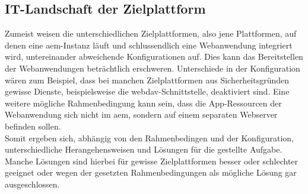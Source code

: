 \subsection{IT-Landschaft der Zielplattform}

Zumeist weisen die unterschiedlichen Zielplattformen, also jene Plattformen, auf denen eine \ac{aem}-Instanz läuft und schlussendlich eine Webanwendung integriert wird, untereinander abweichende Konfigurationen auf. Dies kann das Bereitstellen der Webanwendungen beträchtlich erschweren. Unterschiede in der Konfiguration wären zum Beispiel, dass bei manchen Zielplattformen aus Sicherheitsgründen gewisse Dienste, beispielsweise die \acs{webdav}-Schnittstelle, deaktiviert sind. Eine weitere mögliche Rahmenbedingung kann sein, dass die App-Ressourcen der Webanwendung sich nicht im \ac{aem}, sondern auf einem separaten Webserver befinden sollen. \\
Somit ergeben sich, abhängig von den Rahmenbedingen und der Konfiguration, unterschiedliche Herangehensweisen und Lösungen für die gestellte Aufgabe. Manche Lösungen sind hierbei für gewisse Zielplattformen besser oder schlechter geeignet oder wegen der gesetzten Rahmenbedingungen als mögliche Lösung gar ausgeschlossen.